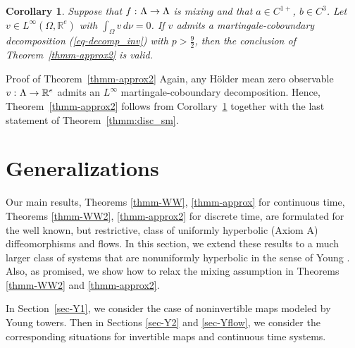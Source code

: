 \documentclass[aop,MSNbibl,seceqn,dvips]{arximspdf}
\newcommand{\eqref}[1]{(\ref{#1})}
\newtheorem{cor}[thmm]{Corollary}
\newcommand{\R}{\mathbb{R}}
\newcommand{\BBW}{\mathbb{W}}
\newcommand{\BBU}{\mathbb{U}}
\begin{document}
\begin{cor} \label{cor-approx2}
Suppose that $f\dvtx\Lambda\to\Lambda$ is mixing and
that $a\in C^{1+}$, $b\in C^3$.
Let $v\in L^\infty(\Omega,\R^e)$ with \mbox{$\int_\Omega v \,d\nu=0$}.
If $v$ admits
a martingale-coboundary decomposition \eqref{eq-decomp_inv} with
$p>\frac{9}2$,
then the conclusion of Theorem~\ref{thmm-approx2} is valid.
\end{cor}


\begin{pf*}{Proof of Theorem~\ref{thmm-approx2}}
Again,
any H\"older mean zero observable $v\dvtx\Lambda\to\R^e$ admits
an $L^\infty$ martingale-coboundary decomposition.
Hence, Theorem~\ref{thmm-approx2} follows from Corollary~\ref{cor-approx2}
together with the last statement of Theorem~\ref{thmm:disc_sm}.
\end{pf*}

\section{Generalizations}
\label{sec-gen}

Our main results, Theorems \ref{thmm-WW}, \ref{thmm-approx} for
continuous time,
Theorems \ref{thmm-WW2}, \ref{thmm-approx2} for discrete time,
are formulated for the well known, but restrictive, class of uniformly
hyperbolic (Axiom A) diffeomorphisms and flows.
In this section, we extend these results to a much larger class of systems
that are nonuniformly hyperbolic in the sense of Young \cite{Young98,Young99}.
Also, as promised, we show how to relax the mixing assumption in
Theorems \ref{thmm-WW2}
and \ref{thmm-approx2}.

In Section~\ref{sec-Y1}, we consider the case of noninvertible maps
modeled by Young towers.
Then in Sections \ref{sec-Y2} and \ref{sec-Yflow}, we consider the
corresponding situations for invertible maps and continuous time systems.
\end{document}
